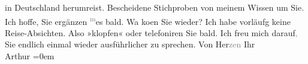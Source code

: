 \begin{ledgroupsized}[t]{13cm}
               in Deutschland herumreist. Bescheidene Stichproben
               von meinem Wissen um Sie. Ich hoffe, Sie ergänzen \substVorne{}\textsuperscript{\textcolor{gray}{m}}\substDazwischen{}es\substHinten{} bald. Wa{\geminationn} ko{\geminationm}en Sie wieder? Ich
               habe vorläufg keine Reise-Absichten. Also »klopfen« oder telefoniren Sie bald. Ich
               freu mich darauf\textcolor{gray}{,} Sie endlich einmal wieder ausführlicher zu sprechen.\pend
           \pstart
           Von Her\textcolor{gray}{zen} Ihr {\\[\baselineskip]}\spacefill\mbox{Arthur}\pend
           \leftskip=0em{}
         
         \endnumbering{}\end{ledgroupsized}  \newcommand{\dateiname}{L03022}\newcommand{\titel}{Arthur Schnitzler an Felix Salten, 10. 2. 1927}\newcommand{\editorInnen}{Martin Anton Müller und Laura Untner}
      